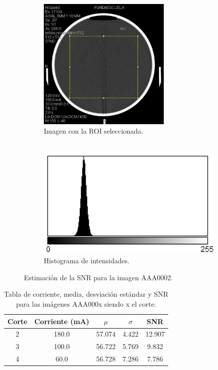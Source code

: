 \documentclass[11pt,twocolumn,twoside]{opticajnl}
\begin{document}
\begin{figure}[h]
    \centering
         \begin{subfigure}[h]{0.49\linewidth}
            \centering
            \includegraphics[width=0.7\textwidth]{Figuras/roi_corte2.png}
            \caption{Imagen con la ROI seleccionada. \\
            $~$} 
         \end{subfigure}
         \begin{subfigure}[h]{0.49\linewidth}
            \centering
            \includegraphics[width=\textwidth]{Figuras/hist_corte2.png}
            \caption{Histograma de intensidades.}
         \end{subfigure}
    \caption{Estimación de la SNR para la imagen AAA0002.}
    \label{fig:SNR}
\end{figure}

\begin{table}[h]
    \centering
    \begin{tabular}{c||c|c|c|c}
    \hline
    Corte & Corriente (mA) & $\mu$     & $\sigma$ & SNR \\ \hline
    2     & 180.0          & 57.074 & 4.422 & 12.907   \\ \hline
    3     & 100.0          & 56.722 & 5.769 & 9.832   \\ \hline
    4     & 60.0           & 56.728 & 7.286 & 7.786   \\ \hline
    \end{tabular}
    \caption{Tabla de corriente, media, desviación estándar y SNR para las imágenes AAA000x siendo x el corte.} \label{tab:SNR}
\end{table}
\end{document}
